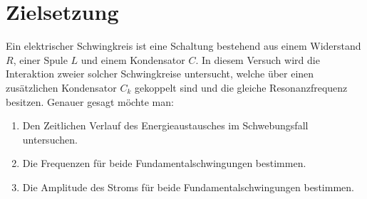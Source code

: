 \section{Zielsetzung}
\label{sec:Zielsetzung}

Ein elektrischer Schwingkreis ist eine Schaltung bestehend aus einem Widerstand $R$, einer Spule $L$ und einem Kondensator $C$.
In diesem Versuch wird die Interaktion zweier solcher Schwingkreise untersucht, welche über einen zusätzlichen Kondensator $C_k$ gekoppelt sind und die gleiche Resonanzfrequenz besitzen. 
Genauer gesagt möchte man:
\begin{enumerate}[label=\alph*)]
    \item Den Zeitlichen Verlauf des Energieaustausches im Schwebungsfall untersuchen.
    \item Die Frequenzen für beide Fundamentalschwingungen bestimmen.
    \item Die Amplitude des Stroms für beide Fundamentalschwingungen bestimmen.
\end{enumerate}